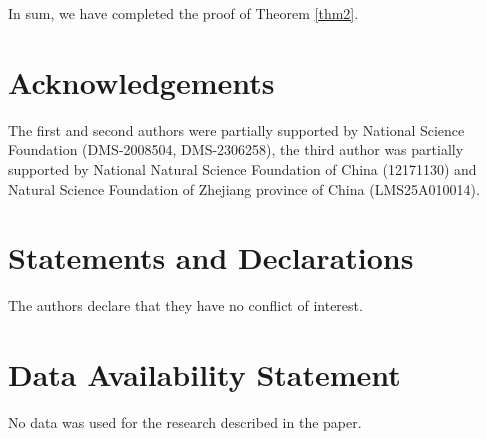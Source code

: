 \documentclass[11pt,reqno]{article}
\numberwithin{equation}{section}
\begin{document}
In sum, we have completed the proof of Theorem \ref{thm2}.


\section*{Acknowledgements}

The first and second authors were partially supported by National Science Foundation (DMS-2008504, DMS-2306258), the third author was partially supported by National Natural Science Foundation of China (12171130) and Natural Science Foundation of
Zhejiang province of China (LMS25A010014).



\section*{Statements and Declarations}
The authors declare that they have no conflict of interest.



\section*{Data Availability Statement}
No data was used for the research described in the paper.
\end{document}
